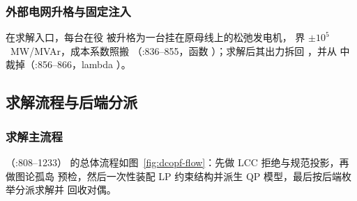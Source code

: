 \subsubsection*{外部电网升格与固定注入}
在求解入口，每台在役  被升格为一台挂在原母线上的松弛发电机，
界 $\pm 10^{5}$~MW/MVAr，成本系数照搬 
（:836--855，函数
）；求解后其出力拆回
，并从  中裁掉（:856--866，lambda
）。

\subsection{求解流程与后端分派}\label{subsec:dcopf-solve}

\subsubsection*{求解主流程}
（:808--1233）
的总体流程如图~\ref{fig:dcopf-flow}：先做 LCC 拒绝与规范投影，再做图论孤岛
预检，然后一次性装配 LP 约束结构并派生 QP 模型，最后按后端枚举分派求解并
回收对偶。


